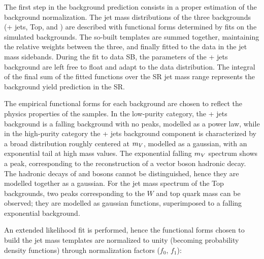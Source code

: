 The first step in the background prediction consists in a proper estimation of the background normalization. The jet mass distributions of the three backgrounds (\V + jets, Top, and \VV) are described with functional forms determined by fits on the simulated backgrounds. The so-built templates are summed together, maintaining the relative weights between the three, and finally fitted to the data in the jet mass sidebands. During the fit to data SB, the parameters of the \V + jets background are left free to float and adapt to the data distribution. The integral of the final sum of the fitted functions over the SR jet mass range represents the background yield prediction in the SR.


\noindent The empirical functional forms for each background are chosen to reflect the physics properties of the samples. In the low-purity category, the \V+ jets background is a falling background with no peaks, modelled as a power law, while in the high-purity category the \V + jets background component is characterized by a broad distribution roughly centered at $m_V$, modelled as a gaussian, with an exponential tail at high mass values. The exponential falling \VV $m_V$ spectrum shows a peak, corresponding to the reconstruction of a vector boson hadronic decay. The hadronic decays of \W and \Z bosons cannot be distinguished, hence they are modelled together as a gaussian. For the jet mass spectrum of the Top backgrounds, two peaks corresponding to the $W$ and top quark mass can be observed; they are modelled as gaussian functions, superimposed to a falling exponential background.

\noindent An extended likelihood fit is performed, hence the functional forms chosen to build the jet mass templates are normalized to unity (becoming probability density functions) through normalization factors ($f_0$, $f_1$):

